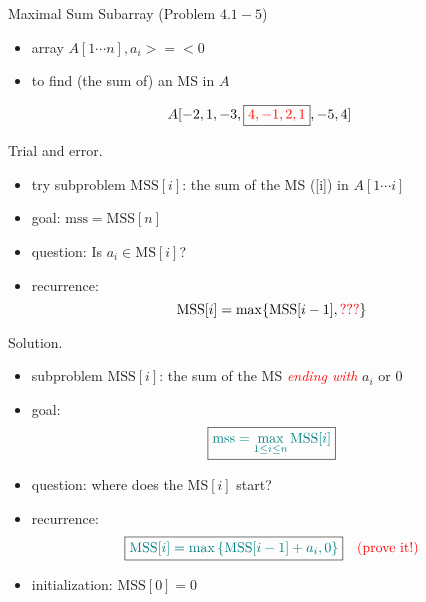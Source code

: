 
\begin{frame}{}
  \begin{exampleblock}{Maximal Sum Subarray (Problem $4.1-5$)}
    \begin{itemize}
      \item array $A[1 \cdots n], a_{i} >=< 0$
      \item to find (the sum of) an MS in $A$
    \end{itemize}
	
    \[
      A[-2,1 ,-3, \boxed{\textcolor{red}{4,-1,2,1}} ,-5,4]
    \]
  \end{exampleblock}

  \pause
  \vspace{0.30cm}
  \begin{alertblock}{Trial and error.}
    \begin{itemize}
      \item try subproblem $\text{MSS}[i]$: the sum of the MS ([i]) in $A[1 \cdots i]$
      \item goal: $\text{mss} = \text{MSS}[n]$
	\pause
      \item question: Is $a_{i} \in \text{MS}[i]$?
      \item recurrence: 
	\[ 
	  \text{MSS}[i] = \max \{\text{MSS}[i-1], \textcolor{red}{???}\}
	\]
    \end{itemize}
  \end{alertblock}
\end{frame}

\begin{frame}{}
  \begin{block}{Solution.}
    \begin{itemize}
      \item subproblem $\text{MSS}[i]$: the sum of the MS \textcolor{red}{\it ending with} $a_{i}$ or 0
      \item goal: 
	\[
	  \boxed{\textcolor{teal}{\text{mss} = \max\limits_{1 \le i \le n} \text{MSS}[i]}}
	\]
      \item<2-> question: where does the $\text{MS}[i]$ start?
      \item<2-> recurrence: 
	\[ 
	  \boxed{\textcolor{teal}{\text{MSS}[i] = \max \left\{\text{MSS}[i-1] + a_{i}, 0\right\}}} \quad \text{\textcolor{red}{(prove it!)}}
	\]
      \item<3-> initialization: $\text{MSS}[0] = 0$
    \end{itemize}

  \end{block}
\end{frame}

